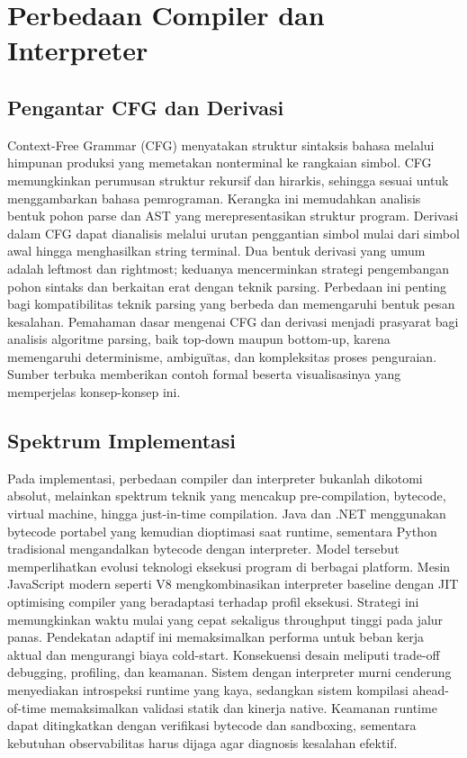 \documentclass[../main.tex]{subfiles}
\begin{document}
\chapter{Perbedaan Compiler dan Interpreter}
\label{ch:compiler-vs-interpreter}

\section{Pengantar CFG dan Derivasi}
Context-Free Grammar (CFG) menyatakan struktur sintaksis bahasa melalui himpunan produksi yang memetakan nonterminal ke rangkaian simbol. CFG memungkinkan perumusan struktur rekursif dan hirarkis, sehingga sesuai untuk menggambarkan bahasa pemrograman.\cite{aho-dragon-book-2006} Kerangka ini memudahkan analisis bentuk pohon parse dan AST yang merepresentasikan struktur program.
Derivasi dalam CFG dapat dianalisis melalui urutan penggantian simbol mulai dari simbol awal hingga menghasilkan string terminal. Dua bentuk derivasi yang umum adalah leftmost dan rightmost; keduanya mencerminkan strategi pengembangan pohon sintaks dan berkaitan erat dengan teknik parsing.\cite{sipser} Perbedaan ini penting bagi kompatibilitas teknik parsing yang berbeda dan memengaruhi bentuk pesan kesalahan.
Pemahaman dasar mengenai CFG dan derivasi menjadi prasyarat bagi analisis algoritme parsing, baik top-down maupun bottom-up, karena memengaruhi determinisme, ambiguïtas, dan kompleksitas proses penguraian. Sumber terbuka memberikan contoh formal beserta visualisasinya yang memperjelas konsep-konsep ini.\cite{grune-parsing}

\section{Spektrum Implementasi}
Pada implementasi, perbedaan compiler dan interpreter bukanlah dikotomi absolut, melainkan spektrum teknik yang mencakup pre-compilation, bytecode, virtual machine, hingga just-in-time compilation. Java dan .NET menggunakan bytecode portabel yang kemudian dioptimasi saat runtime, sementara Python tradisional mengandalkan bytecode dengan interpreter.\cite{jvm-spec, dotnet-ecma} Model tersebut memperlihatkan evolusi teknologi eksekusi program di berbagai platform.
Mesin JavaScript modern seperti V8 mengkombinasikan interpreter baseline dengan JIT optimising compiler yang beradaptasi terhadap profil eksekusi. Strategi ini memungkinkan waktu mulai yang cepat sekaligus throughput tinggi pada jalur panas.\cite{v8-design} Pendekatan adaptif ini memaksimalkan performa untuk beban kerja aktual dan mengurangi biaya cold-start.
Konsekuensi desain meliputi trade-off debugging, profiling, dan keamanan. Sistem dengan interpreter murni cenderung menyediakan introspeksi runtime yang kaya, sedangkan sistem kompilasi ahead-of-time memaksimalkan validasi statik dan kinerja native. Keamanan runtime dapat ditingkatkan dengan verifikasi bytecode dan sandboxing, sementara kebutuhan observabilitas harus dijaga agar diagnosis kesalahan efektif.

\IfSubfilesClassLoaded{%
\printbibliography
}{}
\end{document}
